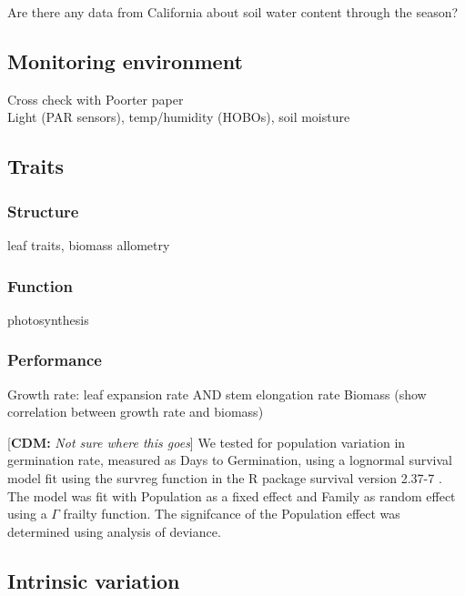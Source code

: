 \documentclass[11pt, oneside]{article}
\newcommand{\cdm}[1]{{ \color{magenta} [{\bf{CDM:}} {\em#1}]}} %
\begin{document}
			Are there any data from California about soil water content through the season?

\subsection*{Monitoring environment}

		Cross check with Poorter paper \\
		Light (PAR sensors), temp/humidity (HOBOs), soil moisture

\subsection*{Traits}

\subsubsection*{Structure}

leaf traits, biomass allometry

\subsubsection*{Function}

photosynthesis

\subsubsection*{Performance}

Growth rate: leaf expansion rate AND stem elongation rate
Biomass (show correlation between growth rate and biomass)

\cdm{Not sure where this goes} We tested for population variation in germination rate, measured as Days to Germination, using a lognormal survival model fit using the survreg function in the R package survival version 2.37-7 \citep{Therneau_2014}. The model was fit with Population as a fixed effect and Family as random effect using a $\Gamma$ frailty function. The signifcance of the Population effect was determined using analysis of deviance.


\subsection*{Intrinsic variation}
\end{document}
